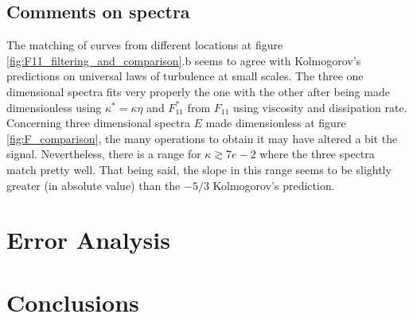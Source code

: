 \documentclass[12pt]{article}
\begin{document}
\subsection{Comments on spectra}

The matching of curves from different locations at figure \ref{fig:F11_filtering_and_comparison}.b seems to agree with Kolmogorov's predictions on universal laws of turbulence at small scales. The three one dimensional spectra fits very properly the one with the other after being made dimensionless using $\kappa^* = \kappa \eta$ and $F_{11}^*$ from $F_{11}$ using viscosity and dissipation rate. Concerning three dimensional spectra $E$ made dimensionless at figure \ref{fig:F_comparison}, the many operations to obtain it may have altered a bit the signal. Nevertheless, there is a range for $\kappa \gtrsim 7e-2$ where the three spectra match pretty well. That being said, the slope in this range seems to be slightly greater (in absolute value) than the $-5/3$ Kolmogorov's prediction.

\section{Error Analysis}

\section{Conclusions}

\newpage


\end{document}
